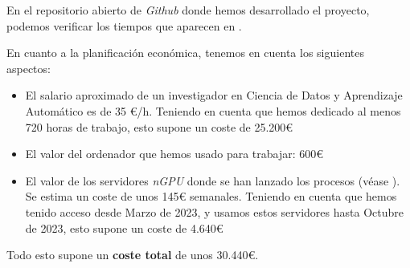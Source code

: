 En el repositorio abierto de \textit{Github} \cite{informatica:repogithub} donde hemos desarrollado el proyecto, podemos verificar los tiempos que aparecen en .

En cuanto a la planificación económica, tenemos en cuenta los siguientes aspectos:

\begin{itemize}
    \item El salario aproximado de un investigador en Ciencia de Datos y Aprendizaje Automático es de 35 €/h. Teniendo en cuenta que hemos dedicado al menos 720 horas de trabajo, esto supone un coste de 25.200€
    \item El valor del ordenador que hemos usado para trabajar: 600€
    \item El valor de los servidores \textit{nGPU} donde se han lanzado los procesos (véase ). Se estima un coste de unos 145€ semanales. Teniendo en cuenta que hemos tenido acceso desde Marzo de 2023, y usamos estos servidores hasta Octubre de 2023, esto supone un coste de 4.640€
\end{itemize}

Todo esto supone un \textbf{coste total} de unos 30.440€.
